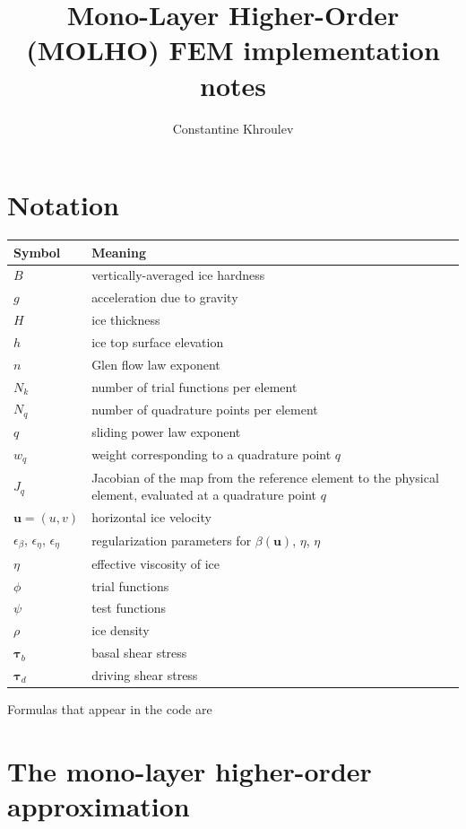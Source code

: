 \documentclass{amsart}
\newcommand{\U}{\mathbf{u}}
\newcommand{\T}{\boldsymbol{\tau}}
\newcommand{\betaU}{\beta(\U)}
\newcommand{\basalshearstress}[1]{\T_{b#1}}
\newcommand{\taub}{\basalshearstress{}}
\newcommand{\drivingstress}[1]{\T_{d#1}}
\newcommand{\taud}{\drivingstress{}}
\newcommand{\highlight}[1]{{\color{red!80!black} \fbox{$ \displaystyle #1 $} }}
\begin{document}
\title{Mono-Layer Higher-Order (MOLHO) FEM implementation notes}
\author{Constantine Khroulev}
\maketitle
\tableofcontents


\section{Notation}
\label{sec-1}

\begin{center}
\begin{tabular}{lp{}}
Symbol & Meaning\\
\hline
$B$ & vertically-averaged ice hardness\\
$g$ & acceleration due to gravity\\
$H$ & ice thickness\\
$h$ & ice top surface elevation\\
$n$ & Glen flow law exponent\\
$N_k$ & number of trial functions per element\\
$N_q$ & number of quadrature points per element\\
$q$ & sliding power law exponent\\
$w_q$ & weight corresponding to a quadrature point $q$\\
$J_q$ & Jacobian of the map from the reference element to the physical element, evaluated at a quadrature point $q$\\
$\U = (u,v)$ & horizontal ice velocity\\
$\epsilon_{\beta}$, $\epsilon_{\eta}$, $\epsilon_{\eta}$ & regularization parameters for $\betaU$, $\eta$, $\eta$\\
$\eta$ & effective viscosity of ice\\
$\phi$ & trial functions\\
$\psi$ & test functions\\
$\rho$ & ice density\\
$\taub$ & basal shear stress\\
$\taud$ & driving shear stress\\
\end{tabular}
\end{center}

Formulas that appear in the code are \highlight{highlighted.}

\section{The mono-layer higher-order approximation}
\label{sec:ssa-strong}
\end{document}
